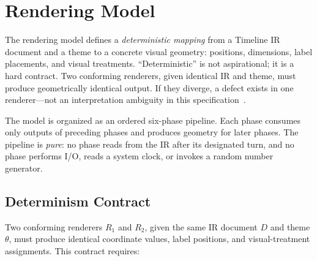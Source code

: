 \section{Rendering Model}
\label{sec:rendering}

The rendering model defines a \emph{deterministic mapping} from a Timeline IR document and a
theme to a concrete visual geometry: positions, dimensions, label placements, and visual
treatments. ``Deterministic'' is not aspirational; it is a hard contract. Two conforming
renderers, given identical IR and theme, must produce geometrically identical output. If they
diverge, a defect exists in one renderer---not an interpretation ambiguity in this
specification~\cite{vegalite2017}.

The model is organized as an ordered six-phase pipeline. Each phase consumes only outputs
of preceding phases and produces geometry for later phases. The pipeline is \emph{pure}: no
phase reads from the IR after its designated turn, and no phase performs I/O, reads a system
clock, or invokes a random number generator.

\subsection{Determinism Contract}
\label{sec:rendering-determinism}

Two conforming renderers $R_1$ and $R_2$, given the same IR document $D$ and theme $\theta$,
must produce identical coordinate values, label positions, and visual-treatment assignments.
This contract requires:


